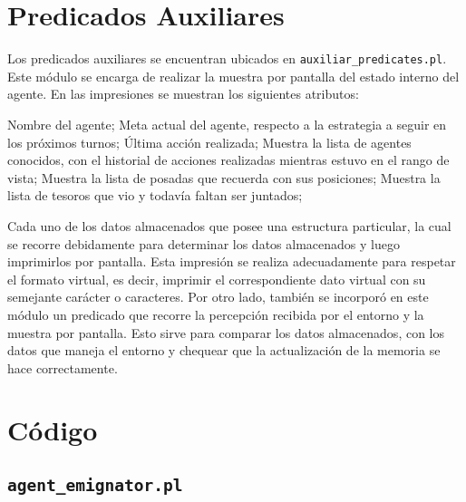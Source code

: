 \documentclass[a4paper,12pt]{report}
\begin{document}
\chapter{Predicados Auxiliares}

Los predicados auxiliares se encuentran ubicados en \texttt{auxiliar\_predicates.pl}.
Este m\'{o}dulo se encarga de realizar la muestra por pantalla del estado interno del agente. 
En las impresiones se muestran los siguientes atributos:

Nombre del agente;
Meta actual del agente, respecto a la estrategia a seguir en los pr\'{o}ximos turnos;
Última acci\'{o}n realizada;
Muestra la lista de agentes conocidos, con el historial de acciones realizadas mientras estuvo en 
el rango de vista;
Muestra la lista de posadas que recuerda con sus posiciones;
Muestra la lista de tesoros que vio y todav\'{i}a faltan ser juntados;

Cada uno de los datos almacenados que posee una estructura particular, la cual se recorre 
debidamente para determinar los datos almacenados y luego imprimirlos por pantalla. 
Esta impresi\'{o}n se realiza adecuadamente para respetar el formato virtual, es decir, imprimir el 
correspondiente dato virtual con su semejante car\'{a}cter o caracteres.
Por otro lado, tambi\'{e}n se incorpor\'{o} en este m\'{o}dulo un predicado que recorre la 
percepci\'{o}n recibida por el entorno y la muestra por pantalla. 
Esto sirve para comparar los datos almacenados, con los datos que maneja el entorno y chequear que 
la actualizaci\'{o}n de la memoria se hace correctamente.

\chapter{C\'{o}digo}

\section{\texttt{agent\_emignator.pl}}
\end{document}
